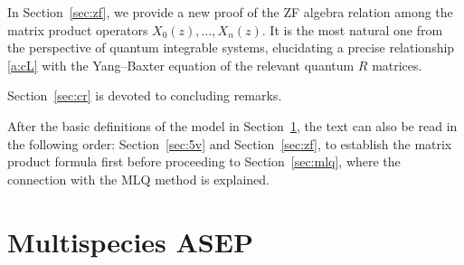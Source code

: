\documentclass[11pt]{article}
\theoremstyle{definition}
\numberwithin{equation}{section}
\begin{document}
In Section~\ref{sec:zf}, we provide a new proof of 
the ZF algebra relation among the matrix product operators $X_0(z), \ldots, X_n(z)$.
It is the most natural one from the perspective of quantum integrable systems, 
elucidating a precise relationship \eqref{a:cL} with the Yang--Baxter equation of the relevant quantum $R$ matrices.

Section~\ref{sec:cr} is devoted to concluding remarks.

After the basic definitions of the model in Section~\ref{sec:asep}, 
the text can also be read in the following order: 
Section~\ref{sec:5v} and  Section~\ref{sec:zf}, 
to establish the matrix product formula first before proceeding 
to Section~\ref{sec:mlq}, where the connection with the MLQ method is explained.


\section{Multispecies ASEP}\label{sec:asep}
\end{document}
